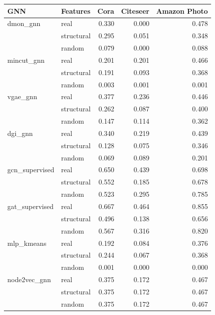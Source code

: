 \footnotesize
\begin{tabular}{llrrr}
\toprule
\textbf{GNN} & \textbf{Features} & \textbf{Cora} & \textbf{Citeseer} & \textbf{Amazon Photo} \\
\midrule
dmon\_gnn & real & 0.330 & 0.000 & 0.478 \\
 & structural & 0.295 & 0.051 & 0.348 \\
 & random & 0.079 & 0.000 & 0.088 \\
\addlinespace[2pt]
mincut\_gnn & real & 0.201 & 0.201 & 0.466 \\
 & structural & 0.191 & 0.093 & 0.368 \\
 & random & 0.003 & 0.001 & 0.001 \\
\addlinespace[2pt]
vgae\_gnn & real & 0.377 & 0.236 & 0.446 \\
 & structural & 0.262 & 0.087 & 0.400 \\
 & random & 0.147 & 0.114 & 0.362 \\
\addlinespace[2pt]
dgi\_gnn & real & 0.340 & 0.219 & 0.439 \\
 & structural & 0.128 & 0.075 & 0.346 \\
 & random & 0.069 & 0.089 & 0.201 \\
\addlinespace[2pt]
gcn\_supervised & real & 0.650 & 0.439 & 0.698 \\
 & structural & 0.552 & 0.185 & 0.678 \\
 & random & 0.523 & 0.295 & 0.785 \\
\addlinespace[2pt]
gat\_supervised & real & 0.667 & 0.464 & 0.855 \\
 & structural & 0.496 & 0.138 & 0.656 \\
 & random & 0.567 & 0.316 & 0.820 \\
\addlinespace[2pt]
mlp\_kmeans & real & 0.192 & 0.084 & 0.376 \\
 & structural & 0.244 & 0.067 & 0.368 \\
 & random & 0.001 & 0.000 & 0.000 \\
\addlinespace[2pt]
node2vec\_gnn & real & 0.375 & 0.172 & 0.467 \\
 & structural & 0.375 & 0.172 & 0.467 \\
 & random & 0.375 & 0.172 & 0.467 \\
\bottomrule
\end{tabular}
\normalsize